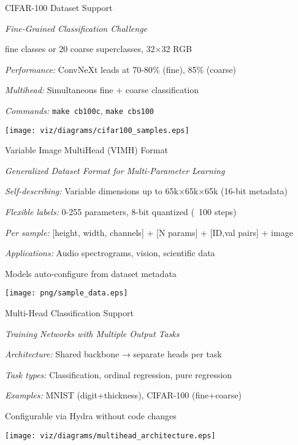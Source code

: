 \begin{slide}[\slideopts,toc={CIFAR-100}]{CIFAR-100 Dataset Support}
  
  \emph{Fine-Grained Classification Challenge}
  
  \begin{itemize}
     fine classes or 20 coarse superclasses, 32×32 RGB
    
    \mpitem \emph{Performance:} ConvNeXt leads at 70-80\% (fine), 85\% (coarse)
    
    \mpitem \emph{Multihead:} Simultaneous fine + coarse classification
    
    \mpitem \emph{Commands:} \texttt{make cb100c}, \texttt{make cbs100}
  \end{itemize}
  
  \vspace{0.5em}
  \centerline{\texttt{[image: viz/diagrams/cifar100\_samples.eps]}}
\end{slide}

\begin{slide}[\slideopts,toc={VIMH}]{Variable Image MultiHead (VIMH) Format}
  
  \emph{Generalized Dataset Format for Multi-Parameter Learning}
  
  \begin{itemize}
    \mpitem \emph{Self-describing:} Variable dimensions up to 65k×65k×65k (16-bit metadata)
    
    \mpitem \emph{Flexible labels:} 0-255 parameters, 8-bit quantized (~100 steps)
    
    \mpitem \emph{Per sample:} [height, width, channels] + [N params] + [ID,val pairs] + image
    
    \mpitem \emph{Applications:} Audio spectrograms, vision, scientific data
    
    \mpitem Models auto-configure from dataset metadata
  \end{itemize}
  
  \vspace{0.5em}
  \centerline{\texttt{[image: png/sample\_data.eps]}}
\end{slide}

\begin{slide}[\slideopts,toc={MultiHead}]{Multi-Head Classification Support}
  
  \emph{Training Networks with Multiple Output Tasks}
  
  \begin{itemize}
    \mpitem \emph{Architecture:} Shared backbone → separate heads per task
    
    \mpitem \emph{Task types:} Classification, ordinal regression, pure regression
    
    \mpitem \emph{Examples:} MNIST (digit+thickness), CIFAR-100 (fine+coarse)
    
    \mpitem Configurable via Hydra without code changes
  \end{itemize}
  
  \vspace{0.5em}
  \centerline{\texttt{[image: viz/diagrams/multihead\_architecture.eps]}}
\end{slide}

